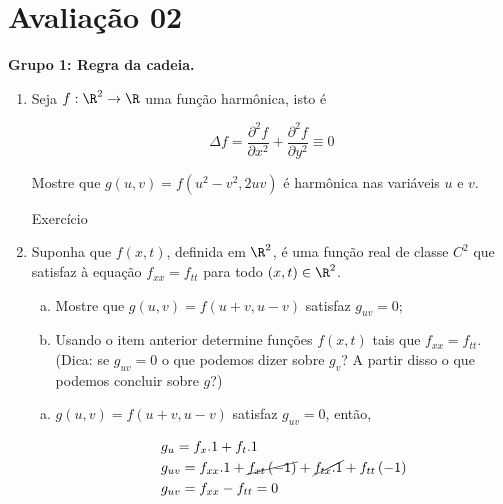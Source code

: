 \documentclass{book}
\begin{document}
\newpage

\section{Avalia\c{c}\~ao 02} \label{secP2}

\textbf{Grupo 1: Regra da cadeia.}

\begin{enumerate}
  \item Seja $f:\R^2 \to \R$ uma fun\c{c}\~ao harm\^onica, isto \'e

\[
\Delta f = \frac{{\partial ^2 f}}
{{\partial x^2 }} + \frac{{\partial ^2 f}}
{{\partial y^2 }} \equiv 0
\]

Mostre que $g\left( {u,v} \right) = f\left( {u^2  - v^2 ,2uv} \right)$ \'e harm\^onica nas vari\'aveis $u$ e $v$.

\begin{sol}
Exerc\'icio
\end{sol}

  \item Suponha que $f(x,t)$, definida em $\R^2$, \'e uma fun\c{c}\~ao real de classe $C^2$ que satisfaz \`a equa\c{c}\~ao $f_{xx} = f_{tt}$ para todo $(x,t) \in \R^2$.

  \begin{enumerate}[(a)]
    \item Mostre que $g\left( {u,v} \right) = f\left( {u + v,u - v} \right)$ satisfaz $g_{uv} = 0$;
    \item Usando o item anterior determine fun\c{c}\~oes $f(x,t)$ tais que $f_{xx} = f_{tt}$. (Dica: se $g_{uv} = 0$ o que podemos dizer sobre $g_v$? A partir disso o que podemos concluir sobre $g$?)
  \end{enumerate}

\begin{sol}
  \begin{enumerate}[(a)]
    \item $g\left( {u,v} \right) = f\left( {u + v,u - v} \right)$ satisfaz $g_{uv} = 0$, ent\~ao,

\[
\begin{gathered}
  g_u  = f_x .1 + f_t .1 \hfill \\
  g_{uv}  = f_{xx} .1 + \cancel{f_{xt} \left( { - 1} \right)} + \cancel{f_{tx} .1} + f_{tt} \left( { - 1} \right) \hfill \\
  g_{uv}  = f_{xx}  - f_{tt}  = 0 \hfill \\
\end{gathered}
\]



\end{enumerate}
\end{sol}
\end{enumerate}
\end{document}
